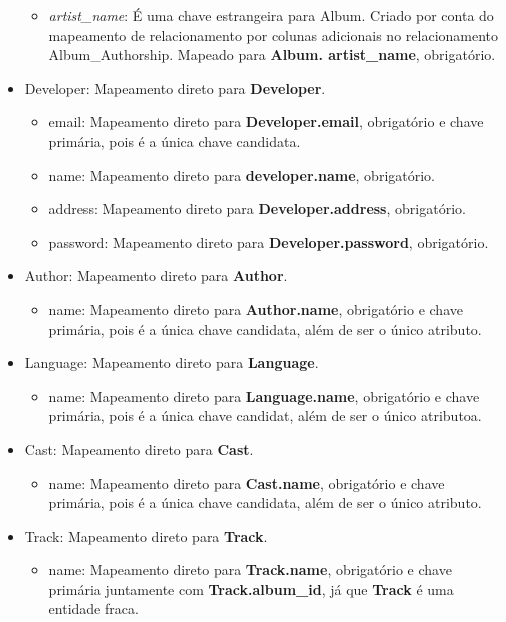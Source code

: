 \documentclass[a4paper, 11pt]{article}
\begin{document}
\begin{itemize}
\begin{itemize}
        \item {\textit{artist\_name}}: É uma chave estrangeira para Album. Criado por conta do mapeamento de relacionamento por colunas adicionais no relacionamento Album\_Authorship. Mapeado para {\textbf{Album. artist\_name}}, obrigatório.
    \end{itemize}
    \item Developer: Mapeamento direto para {\textbf{Developer}}.
    \begin{itemize}
        \item email: Mapeamento direto para {\textbf{Developer.email}}, obrigatório e chave primária, pois é a única chave candidata.
        \item name: Mapeamento direto para {\textbf{developer.name}}, obrigatório.
        \item address: Mapeamento direto para {\textbf{Developer.address}}, obrigatório.
        \item password: Mapeamento direto para {\textbf{Developer.password}}, obrigatório.
    \end{itemize}
    \item Author: Mapeamento direto para {\textbf{Author}}.
    \begin{itemize}
        \item name: Mapeamento direto para {\textbf{Author.name}}, obrigatório e chave primária, pois é a única chave candidata, além de ser o único atributo.
    \end{itemize}
    \item Language: Mapeamento direto para {\textbf{Language}}.
    \begin{itemize}
        \item name: Mapeamento direto para {\textbf{Language.name}}, obrigatório e chave primária, pois é a única chave candidat, além de ser o único atributoa.
    \end{itemize}
    \item Cast: Mapeamento direto para {\textbf{Cast}}.
    \begin{itemize}
        \item name: Mapeamento direto para {\textbf{Cast.name}}, obrigatório e chave primária, pois é a única chave candidata, além de ser o único atributo.
    \end{itemize}
    \item Track: Mapeamento direto para {\textbf{Track}}.
    \begin{itemize}
        \item name: Mapeamento direto para {\textbf{Track.name}}, obrigatório e chave primária juntamente com \textbf{Track.album\_id}, já que \textbf{Track} é uma entidade fraca.

\end{itemize}
\end{itemize}
\end{document}
